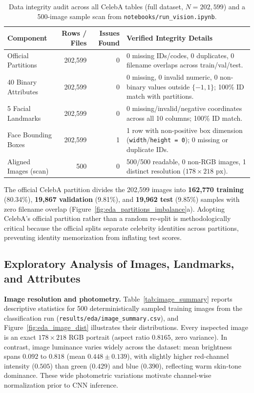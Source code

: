 \documentclass[12pt,a4paper]{article}
\newcommand{\code}[1]{\texttt{#1}}
\begin{document}
\begin{table}[H]
  \centering
  \caption[Data integrity audit across all CelebA tables]{Data integrity audit across all CelebA tables (full dataset, $N = 202{,}599$) and a 500-image sample scan from \code{notebooks/\allowbreak{}run\_\allowbreak{}vision.ipynb}.}
  \label{tab:eda_integrity}
  \small
  \begin{tabularx}{\textwidth}{@{}l r r Y@{}}
    \toprule
    \textbf{Component} & \textbf{Rows / Files} & \textbf{Issues Found} & \textbf{Verified Integrity Details} \\
    \midrule
    Official Partitions & 202,599 & 0 & 0 missing IDs/codes, 0 duplicates, 0 filename overlaps across train/val/test. \\
    40 Binary Attributes & 202,599 & 0 & 0 missing, 0 invalid numeric, 0 non-binary values outside $\{-1, 1\}$; 100\% ID match with partitions. \\
    5 Facial Landmarks & 202,599 & 0 & 0 missing/invalid/negative coordinates across all 10 columns; 100\% ID match. \\
    Face Bounding Boxes & 202,599 & 1 & 1 row with non-positive box dimension (\code{width}/\code{height = 0}); 0 missing or duplicate IDs. \\
    Aligned Images (scan) & 500 & 0 & 500/500 readable, 0 non-RGB images, 1 distinct resolution ($178 \times 218\text{ px}$). \\
    \bottomrule
  \end{tabularx}
\end{table}

The official CelebA partition divides the 202,599 images into \textbf{162,770 training} (80.34\%), \textbf{19,867 validation} (9.81\%), and \textbf{19,962 test} (9.85\%) samples with zero filename overlap (Figure~\ref{fig:eda_partitions_imbalance}a). Adopting CelebA's official partition rather than a random re-split is methodologically critical because the official splits separate celebrity identities across partitions, preventing identity memorization from inflating test scores.

\subsection{Exploratory Analysis of Images, Landmarks, and Attributes}
\label{subsec:eda_findings}

\textbf{Image resolution and photometry.} Table~\ref{tab:image_summary} reports descriptive statistics for 500 deterministically sampled training images from the classification run (\code{results/\allowbreak{}eda/\allowbreak{}image\_\allowbreak{}summary.csv}), and Figure~\ref{fig:eda_image_dist} illustrates their distributions. Every inspected image is an exact $178 \times 218$ RGB portrait (aspect ratio $0.8165$, zero variance). In contrast, image luminance varies widely across the dataset: mean brightness spans $0.092$ to $0.818$ (mean $0.448 \pm 0.139$), with slightly higher red-channel intensity ($0.505$) than green ($0.429$) and blue ($0.390$), reflecting warm skin-tone dominance. These wide photometric variations motivate channel-wise normalization prior to CNN inference.
\end{document}
